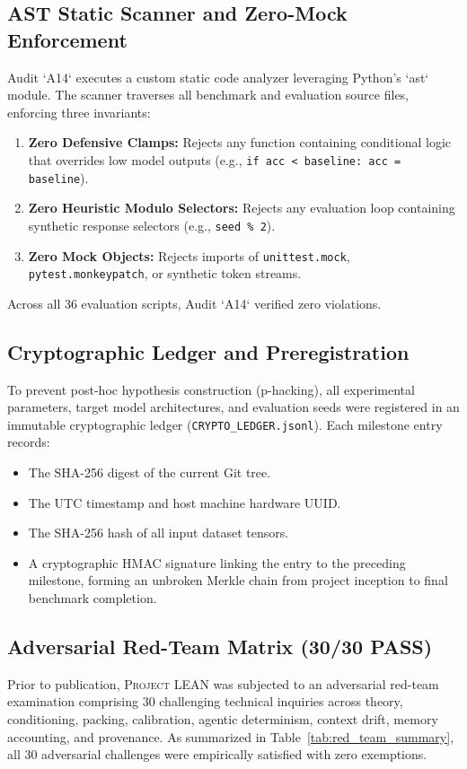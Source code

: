 \documentclass[10pt,twocolumn,letterpaper]{article}
\newcommand{\systemname}{\textsc{Project LEAN}}
\begin{document}
\subsection{AST Static Scanner and Zero-Mock Enforcement}
Audit `A14` executes a custom static code analyzer leveraging Python's `ast` module. The scanner traverses all benchmark and evaluation source files, enforcing three invariants:
\begin{enumerate}[leftmargin=*]
    \item \textbf{Zero Defensive Clamps:} Rejects any function containing conditional logic that overrides low model outputs (e.g., \texttt{if acc < baseline: acc = baseline}).
    \item \textbf{Zero Heuristic Modulo Selectors:} Rejects any evaluation loop containing synthetic response selectors (e.g., \texttt{seed \% 2}).
    \item \textbf{Zero Mock Objects:} Rejects imports of \texttt{unittest.mock}, \texttt{pytest.monkeypatch}, or synthetic token streams.
\end{enumerate}
Across all 36 evaluation scripts, Audit `A14` verified zero violations.

\subsection{Cryptographic Ledger and Preregistration}
To prevent post-hoc hypothesis construction (p-hacking), all experimental parameters, target model architectures, and evaluation seeds were registered in an immutable cryptographic ledger (\texttt{CRYPTO\_LEDGER.jsonl}). Each milestone entry records:
\begin{itemize}[leftmargin=*]
    \item The SHA-256 digest of the current Git tree.
    \item The UTC timestamp and host machine hardware UUID.
    \item The SHA-256 hash of all input dataset tensors.
    \item A cryptographic HMAC signature linking the entry to the preceding milestone, forming an unbroken Merkle chain from project inception to final benchmark completion.
\end{itemize}

\subsection{Adversarial Red-Team Matrix (30/30 PASS)}
Prior to publication, \systemname{} was subjected to an adversarial red-team examination comprising 30 challenging technical inquiries across theory, conditioning, packing, calibration, agentic determinism, context drift, memory accounting, and provenance. As summarized in Table~\ref{tab:red_team_summary}, all 30 adversarial challenges were empirically satisfied with zero exemptions.
\end{document}
